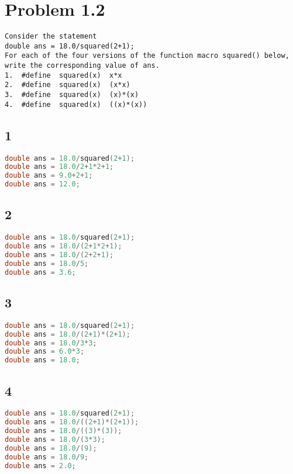 \documentclass[12pt]{article}
\begin{document}
\section*{Problem 1.2}
\begin{verbatim}
Consider the statement
double ans = 18.0/squared(2+1);
For each of the four versions of the function macro squared() below, 
write the corresponding value of ans.
1.  #define  squared(x)  x*x
2.  #define  squared(x)  (x*x)
3.  #define  squared(x)  (x)*(x)
4.  #define  squared(x)  ((x)*(x))
\end{verbatim}

\subsection*{1}
\begin{lstlisting}[frame=single, language=C]
double ans = 18.0/squared(2+1);
double ans = 18.0/2+1*2+1;
double ans = 9.0+2+1;
double ans = 12.0;
\end{lstlisting}

\subsection*{2}
\begin{lstlisting}[frame=single, language=C]
double ans = 18.0/squared(2+1);
double ans = 18.0/(2+1*2+1);
double ans = 18.0/(2+2+1);
double ans = 18.0/5;
double ans = 3.6;
\end{lstlisting}

\subsection*{3}
\begin{lstlisting}[frame=single, language=C]
double ans = 18.0/squared(2+1);
double ans = 18.0/(2+1)*(2+1);
double ans = 18.0/3*3;
double ans = 6.0*3;
double ans = 18.0;
\end{lstlisting}

\subsection*{4}
\begin{lstlisting}[frame=single, language=C]
double ans = 18.0/squared(2+1);
double ans = 18.0/((2+1)*(2+1));
double ans = 18.0/((3)*(3));
double ans = 18.0/(3*3);
double ans = 18.0/(9);
double ans = 18.0/9;
double ans = 2.0;
\end{lstlisting}
\end{document}
